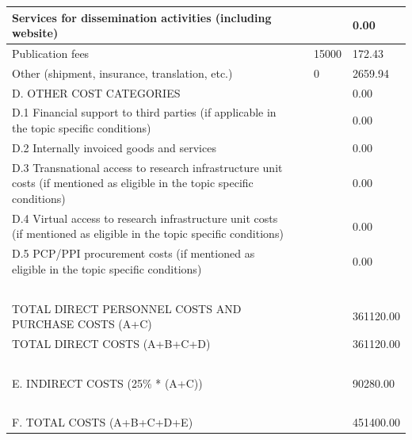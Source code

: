 \begin{table}[H]
\begin{tabular}{|l|l|l|l|}
Services for dissemination activities (including website) & ~ & ~ & 0.00 \\ \hline
Publication fees & ~ & 15000 & 172.43 \\ \hline
Other (shipment, insurance, translation, etc.) & ~ & 0 & 2659.94 \\ \hline
D. OTHER COST CATEGORIES & ~ & ~ & 0.00\\ \hline
D.1 Financial support to third parties (if applicable in the topic specific conditions) & ~ & ~ & 0.00 \\ \hline
D.2 Internally invoiced goods and services & ~ & ~ & 0.00 \\ \hline
D.3 Transnational access to research infrastructure unit costs (if mentioned as eligible in the topic specific conditions) & ~ & ~ & 0.00 \\ \hline
D.4 Virtual access to research infrastructure unit costs (if mentioned as eligible in the topic specific conditions) & ~ & ~ & 0.00 \\ \hline
D.5 PCP/PPI procurement costs (if mentioned as eligible in the topic specific conditions) & ~ & ~ & 0.00 \\ \hline
~ & ~ & ~ & ~ \\ \hline
TOTAL DIRECT PERSONNEL COSTS AND PURCHASE COSTS (A+C) & ~ & ~ & 361120.00 \\ \hline
TOTAL DIRECT COSTS (A+B+C+D) & ~ & ~ & 361120.00 \\ \hline
~ & ~ & ~ & ~ \\ \hline
E. INDIRECT COSTS (25\% * (A+C)) & ~ & ~ & 90280.00 \\ \hline
~ & ~ & ~ & ~ \\ \hline
F. TOTAL COSTS (A+B+C+D+E) & ~ & ~ & 451400.00 \\ \hline
\end{tabular}
\end{table}

